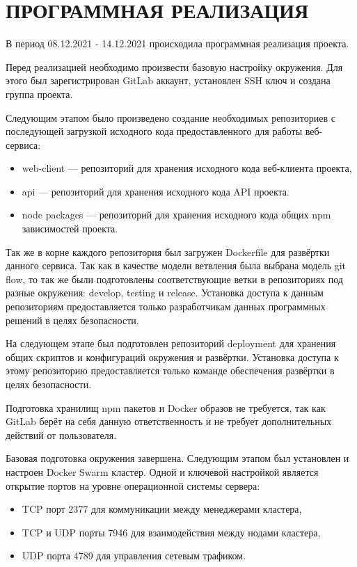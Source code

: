 \section{ПРОГРАММНАЯ РЕАЛИЗАЦИЯ}

В период 08.12.2021 - 14.12.2021 происходила программная реализация проекта.

Перед реализацией необходимо произвести базовую настройку окружения.
Для этого был зарегистрирован GitLab аккаунт, установлен SSH ключ и создана группа проекта.

Следующим этапом было произведено создание необходимых репозиториев с последующей загрузкой исходного кода предоставленного для работы веб-сервиса:

\begin{itemize}
    \item web-client --- репозиторий для хранения исходного кода веб-клиента проекта,
    \item api --- репозиторий для хранения исходного кода API проекта.
    \item node packages --- репозиторий для хранения исходного кода общих npm зависимостей проекта.
\end{itemize}

Так же в корне каждого репозитория был загружен Dockerfile для развёртки данного сервиса.
Так как в качестве модели ветвления была выбрана модель git flow, то так же были подготовлены соответствующие ветки в репозиториях под разные окружения: develop, testing и release.
Установка доступа к данным репозиториям предоставляется только разработчикам данных программных решений в целях безопасности.

На следующем этапе был подготовлен репозиторий deployment для хранения общих скриптов и конфигураций окружения и развёртки.
Установка доступа к этому репозиторию предоставляется только команде обеспечения развёртки в целях безопасности.

Подготовка хранилищ npm пакетов и Docker образов не требуется, так как GitLab берёт на себя данную ответственность и не требует дополнительных действий от пользователя.

Базовая подготовка окружения завершена.
Следующим этапом был установлен и настроен Docker Swarm кластер.
Одной и ключевой настройкой является открытие портов на уровне операционной системы сервера:

\begin{itemize}
    \item TCP порт 2377 для коммуникации между менеджерами кластера,
    \item TCP и UDP порты 7946 для взаимодействия между нодами кластера,
    \item UDP порта 4789 для управления сетевым трафиком.
\end{itemize}

